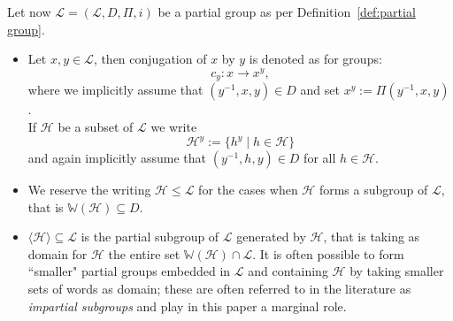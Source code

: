\documentclass{amsart}
\numberwithin{equation}{section}
\theoremstyle{definition}
\theoremstyle{subresult}
\theoremstyle{caseresult}
\newcommand{\W}{\mathbb{W}}
\renewcommand{\L}{\mathcal{L}}
\renewcommand{\H}{\mathcal{H}}
\newcommand{\inv}{^{-1}}
\newcommand{\fto}{\longrightarrow}
\newcommand{\<}{\langle}
\renewcommand{\>}{\rangle}
\begin{document}
\vspace{0.8cm}
Let now $\L=(\L,D,\Pi,i)$ be a partial group as per Definition~\ref{def:partial group}.

\begin{itemize}
	\item Let $x,y \in \L$, then conjugation of $x$ by $y$ is denoted as for groups:
	\[
		c_y \colon x \fto x^y,
	\]
	where we implicitly assume that $(y\inv,x,y) \in D$ and set $x^y := \Pi(y\inv,x,y)$.\\
	If $\H$ be a subset of $\L$ we write
	\[
		\H^y := \{ h^y \mid h \in \H\}
	\]
	and again implicitly assume that $(y\inv,h,y) \in D$ for all $h \in \H$.
	\item We reserve the writing $\H \le \L$ for the cases when $\H$ forms a subgroup of $\L$, that is $\W(\H) \subseteq D$.
	\item $\< \H \> \subseteq \L$ is the partial subgroup of $\L$ generated by $\H$, that is taking as domain for $\H$ the entire set $\W(\H) \cap \L$. It is often possible to form ``smaller" partial groups embedded in $\L$ and containing $\H$ by taking smaller sets of words as domain; these are often referred to in the literature as \emph{impartial subgroups} and play in this paper a marginal role.
\end{itemize}
\end{document}
